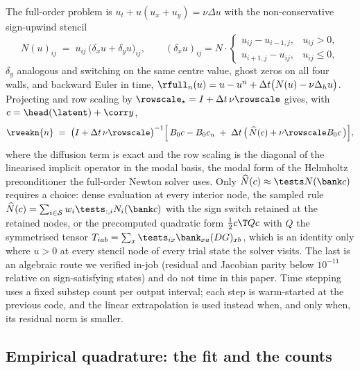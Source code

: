 The full-order problem is $u_t+u(u_x+u_y)=\nu\Delta u$ with the non-conservative
sign-upwind stencil
\begin{equation}
  N(u)_{ij} \;=\; u_{ij}\,\big(\delta_x u + \delta_y u\big)_{ij},
  \qquad
  (\delta_x u)_{ij} = N\!\cdot\!
  \begin{cases}
    u_{ij}-u_{i-1,j}, & u_{ij}>0,\\[2pt]
    u_{i+1,j}-u_{ij}, & u_{ij}\le 0,
  \end{cases}
  \label{eq:upwind}
\end{equation}
$\delta_y$ analogous and switching on the same centre value, ghost zeros on all
four walls, and backward Euler in time,
$\rfull_n(u)=u-u^{n}+\Delta t\big(N(u)-\nu\Delta_h u\big)$. Projecting and row
scaling by $\rowscale_\star=I+\Delta t\,\nu\rowscale$ gives, with
$c=\head(\latent)+\corr y$,
\begin{equation}
  \rweakn{n}
  \;=\;
  \big(I+\Delta t\,\nu\rowscale\big)^{-1}
  \Big[\,
    B_0c-B_0c_n
    \;+\;\Delta t\,\big(\,\widehat{N}(c)+\nu\rowscale B_0c\,\big)
  \Big],
  \label{eq:burgers-step}
\end{equation}
where the diffusion term is exact and the row scaling is the diagonal of the
linearised implicit operator in the modal basis, the modal form of the
Helmholtz preconditioner the full-order Newton solver uses. Only
$\widehat{N}(c)\approx\tests N(\bank c)$ requires a choice: dense evaluation at
every interior node, the sampled rule
$\widehat{N}(c)=\sum_{i\in\mathcal S}w_i\tests_{:,i}N_i(\bank c)$ with the sign
switch retained at the retained nodes, or the precomputed quadratic form
$\tfrac12 c\T Q c$ with $Q$ the symmetrised tensor
$T_{iab}=\sum_x\tests_{ix}\bank_{xa}(DG)_{xb}$, which is an identity only where
$u>0$ at every stencil node of every trial state the solver visits. The last is
an algebraic route we verified in-job (residual and Jacobian parity below
$10^{-11}$ relative on sign-satisfying states) and do not time in this paper.
Time stepping uses a fixed substep count per output interval; each step is
warm-started at the previous code, and the linear extrapolation is used instead
when, and only when, its residual norm is smaller.

\subsection{Empirical quadrature: the fit and the counts}
\label{app:method:eq}

